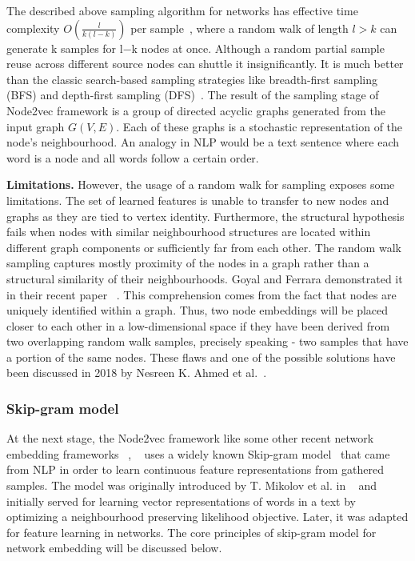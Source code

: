 The described above sampling algorithm for networks has effective time complexity $O(\frac{l}{k(l-k)})$ per sample~\cite{node2vec}, where a random walk of length $l>k$ can generate k samples for l−k nodes at once. Although a random partial sample reuse across different source nodes can shuttle it insignificantly. It is much better than the classic search-based sampling strategies like breadth-first sampling (BFS) and depth-first sampling (DFS)~\cite{node2vec}. 
The result of the sampling stage of Node2vec framework is a group of directed acyclic graphs generated from the input graph $G(V,E)$. Each of these graphs is a stochastic representation of the node’s neighbourhood. An analogy in NLP would be a text sentence where each word is a node and all words follow a certain order.

\textbf{Limitations. } 
\label{Limitations of Node2vec}
However, the usage of a random walk for sampling exposes some limitations. The set of learned features is unable to transfer to new nodes and graphs as they are tied to vertex identity. Furthermore, the structural hypothesis fails when nodes with similar neighbourhood structures are located within different graph components or sufficiently far from each other. The random walk sampling captures mostly proximity of the nodes in a graph rather than a structural similarity of their neighbourhoods. Goyal and Ferrara demonstrated it in their recent paper ~\cite{Goyal2018GraphET}. This comprehension comes from the fact that nodes are uniquely identified within a graph. Thus, two node embeddings will be placed closer to each other in a low-dimensional space if they have been derived from two overlapping random walk samples, precisely speaking - two samples that have a portion of the same nodes. These flaws and one of the possible solutions have been discussed in 2018 by Nesreen K. Ahmed et al.~\cite{role2vec}. 

\subsubsection{Skip-gram model}
\label{Skip-gram_Model}
At the next stage, the Node2vec framework like some other recent network embedding frameworks ~\cite{perozzi2014deepwalk}, ~\cite{tang2015line} uses a widely known Skip-gram model~\cite{SKIP-GRAM-MODEL} that came from NLP in order to learn continuous feature representations from gathered samples. The model was originally introduced by T. Mikolov et al. in ~\cite{SKIP-GRAM-MODEL} and initially served for learning vector representations of words in a text by optimizing a neighbourhood preserving likelihood objective. Later, it was adapted for feature learning in networks. The core principles of skip-gram model for network embedding will be discussed below.

